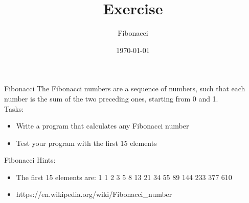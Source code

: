 


\title{Exercise}
\subtitle{Fibonacci}
\date{\today}




\begin{frame}
    \titlepage
\end{frame}

\begin{frame}{Fibonacci}
    The Fibonacci numbers are a sequence of numbers, such that each number is the sum of the two preceding ones, starting from 0 and 1.\\
    Tasks:
    \begin{itemize}
        \item Write a program that calculates any Fibonacci number
        \item Test your program with the first 15 elements
    \end{itemize}
\end{frame}

\begin{frame}{Fibonacci}
    Hints:
    \begin{itemize}
        \item The first 15 elements are: 1 1 2 3 5 8 13 21 34 55 89 144 233 377 610
        \item https://en.wikipedia.org/wiki/Fibonacci_number
    \end{itemize}
\end{frame}



